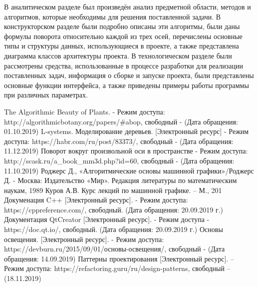 \documentclass[54pt, a4paper]{article}
\begin{document}
	В аналитическом разделе был произведён анализ предметной области, методов и алгоритмов, которые необходимы для решения поставленной задачи. В конструкторском разделе были подробно описаны эти алгоритмы, были даны формулы поворота относительно каждой из трех осей, перечислены основные типы и структуры данных, использующиеся в проекте, а также представлена диаграмма классов архитектуры проекта. В технологическом разделе были рассмотрены средства, использованные в процессе разработки для реализации поставленных задач, информация о сборке и запуске проекта, были представлены основные функции интерфейса, а также приведены примеры
	работы программы при различных параметрах.
	\addto{}
	\newpage
	
    \begin{thebibliography}{9}
     The Algorithmic Beauty of Plants. - Режим доступа: http://algorithmicbotany.org/papers/\#abop, свободный - (Дата обращения: 01.10.2019)
     L-systems. Моделирование деревьев. [Электронный ресурс] - Режим доступа: https://habr.com/ru/post/83373/, свободный - (Дата обращения: 11.12.2019)
     Поворот вокруг произвольной оси в пространстве - Режим доступа: http://scask.ru/a\_book\_mm3d.php?id=60,  свободный - (Дата обращения: 11.10.2019)
   	Роджерс Д., «Алгоритмические основы машинной графики»/Роджерс Д.
   	- Москва: Издательство «Мир». Редакция литературы по математическим наукам,
   	1989
   	Куров А.В. Курс лекций по машинной графике. – М., 201
     Докуменация C++ [Электронный ресурс]. - Режим доступа: https://cppreference.com/, свободный. (Дата обращения: 20.09.2019 г.)
     Документация QtCreator [Электронный ресурс]. - Режим доступа - https://doc.qt.io/, свободный. (Дата обращения: 20.09.2019 г.) 
	 Основы освещения. [Электронный ресурс]. - Режим доступа: https://devburn.ru/2015/09/01/основы-освещения/, свободный  - (Дата обращения: 14.09.2019)    
	 Паттерны проектирования [Электронный ресурс]. – Режим доступа: https://refactoring.guru/ru/design-patterns, свободный –
	(18.11.2019)
\end{thebibliography}
    
\end{document}

